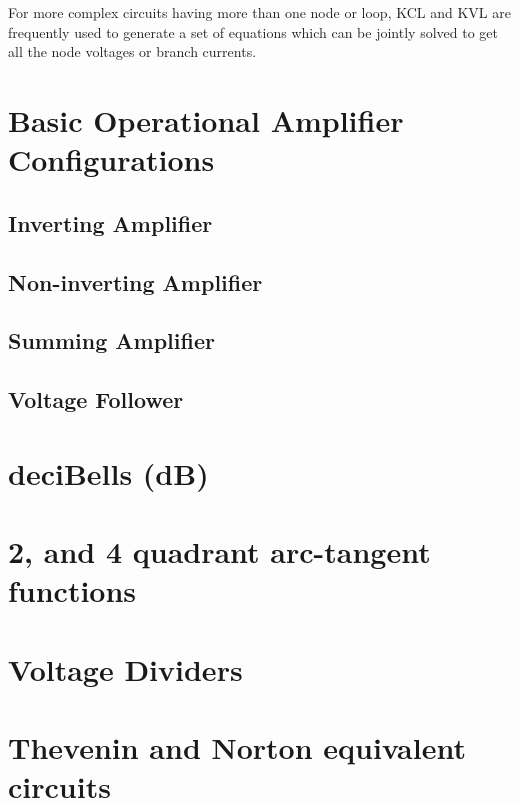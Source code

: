 For more complex circuits having more than one node or loop,
KCL and KVL are frequently used to generate a set of equations which can be
jointly solved to get all the node voltages or branch currents.



\section{Basic Operational Amplifier Configurations}


\subsection{Inverting Amplifier}
\subsection{Non-inverting Amplifier}
\subsection{Summing Amplifier}
\subsection{Voltage Follower}

\section{deciBells (dB)}

\section{2, and 4 quadrant arc-tangent functions}

\section{Voltage Dividers}

\section{Thevenin and Norton equivalent circuits}

